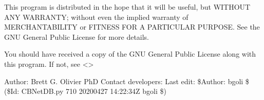 \documentclass[letterpaper,10pt,english]{sphinxmanual}
\begin{document}
\sphinxAtStartPar
This program is distributed in the hope that it will be useful,
but WITHOUT ANY WARRANTY; without even the implied warranty of
MERCHANTABILITY or FITNESS FOR A PARTICULAR PURPOSE.  See the
GNU General Public License for more details.

\sphinxAtStartPar
You should have received a copy of the GNU General Public License
along with this program.  If not, see \textless{}\textgreater{}

\sphinxAtStartPar
Author: Brett G. Olivier PhD
Contact developers: 
Last edit: \$Author: bgoli \$ (\$Id: CBNetDB.py 710 2020\sphinxhyphen{}04\sphinxhyphen{}27 14:22:34Z bgoli \$)
\end{document}
